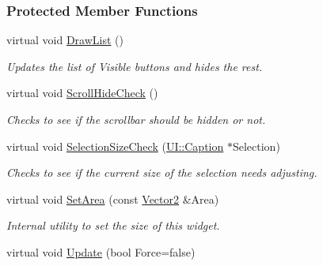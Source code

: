 \subsubsection*{Protected Member Functions}
\begin{DoxyCompactItemize}
\item 
\hypertarget{classphys_1_1UI_1_1ListBox_a4cc701e644aec861743ceff8bfc8793a}{
virtual void \hyperlink{classphys_1_1UI_1_1ListBox_a4cc701e644aec861743ceff8bfc8793a}{DrawList} ()}
\label{classphys_1_1UI_1_1ListBox_a4cc701e644aec861743ceff8bfc8793a}

\begin{DoxyCompactList}\small\item\em Updates the list of Visible buttons and hides the rest. \item\end{DoxyCompactList}\item 
\hypertarget{classphys_1_1UI_1_1ListBox_a67732b1ba61e299e2833b3b624a0fb43}{
virtual void \hyperlink{classphys_1_1UI_1_1ListBox_a67732b1ba61e299e2833b3b624a0fb43}{ScrollHideCheck} ()}
\label{classphys_1_1UI_1_1ListBox_a67732b1ba61e299e2833b3b624a0fb43}

\begin{DoxyCompactList}\small\item\em Checks to see if the scrollbar should be hidden or not. \item\end{DoxyCompactList}\item 
\hypertarget{classphys_1_1UI_1_1ListBox_ac97d5d2e730b9899b7d265ae62f603f4}{
virtual void \hyperlink{classphys_1_1UI_1_1ListBox_ac97d5d2e730b9899b7d265ae62f603f4}{SelectionSizeCheck} (\hyperlink{classphys_1_1UI_1_1Caption}{UI::Caption} $\ast$Selection)}
\label{classphys_1_1UI_1_1ListBox_ac97d5d2e730b9899b7d265ae62f603f4}

\begin{DoxyCompactList}\small\item\em Checks to see if the current size of the selection needs adjusting. \item\end{DoxyCompactList}\item 
\hypertarget{classphys_1_1UI_1_1ListBox_a283784a49458dccbc0b94bb4e835e727}{
virtual void \hyperlink{classphys_1_1UI_1_1ListBox_a283784a49458dccbc0b94bb4e835e727}{SetArea} (const \hyperlink{classphys_1_1Vector2}{Vector2} \&Area)}
\label{classphys_1_1UI_1_1ListBox_a283784a49458dccbc0b94bb4e835e727}

\begin{DoxyCompactList}\small\item\em Internal utility to set the size of this widget. \item\end{DoxyCompactList}\item 
\hypertarget{classphys_1_1UI_1_1ListBox_ac278c07a77081774369f76a4c7b12760}{
virtual void \hyperlink{classphys_1_1UI_1_1ListBox_ac278c07a77081774369f76a4c7b12760}{Update} (bool Force=false)}
\label{classphys_1_1UI_1_1ListBox_ac278c07a77081774369f76a4c7b12760}


\end{DoxyCompactItemize}
